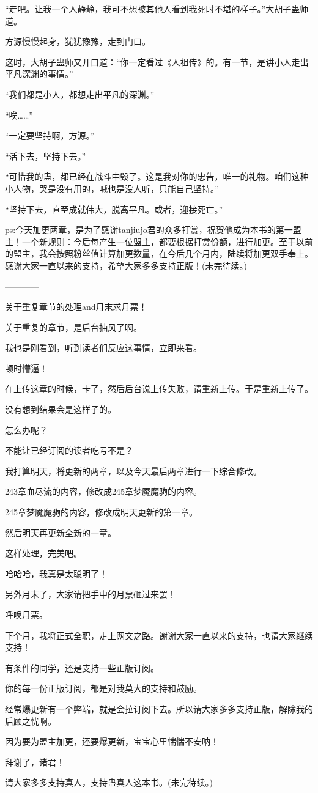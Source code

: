\begin{this_body}
“走吧。让我一个人静静，我可不想被其他人看到我死时不堪的样子。”大胡子蛊师道。

方源慢慢起身，犹犹豫豫，走到门口。

这时，大胡子蛊师又开口道：“你一定看过《人祖传》的。有一节，是讲小人走出平凡深渊的事情。”

“我们都是小人，都想走出平凡的深渊。”

“唉……”

“一定要坚持啊，方源。”

“活下去，坚持下去。”

“可惜我的蛊，都已经在战斗中毁了。这是我对你的忠告，唯一的礼物。咱们这种小人物，哭是没有用的，喊也是没人听，只能自己坚持。”

“坚持下去，直至成就伟大，脱离平凡。或者，迎接死亡。”

ps:今天加更两章，是为了感谢tanjiujo君的众多打赏，祝贺他成为本书的第一盟主！一个新规则：今后每产生一位盟主，都要根据打赏份额，进行加更。至于以前的盟主，我会按照粉丝值计算加更数量，在今后几个月内，陆续将加更双手奉上。感谢大家一直以来的支持，希望大家多多支持正版！(未完待续。)

------------

关于重复章节的处理and月末求月票！

关于重复的章节，是后台抽风了啊。

我也是刚看到，听到读者们反应这事情，立即来看。

顿时懵逼！

在上传这章的时候，卡了，然后后台说上传失败，请重新上传。于是重新上传了。

没有想到结果会是这样子的。

怎么办呢？

不能让已经订阅的读者吃亏不是？

我打算明天，将更新的两章，以及今天最后两章进行一下综合修改。

243章血尽流的内容，修改成245章梦魇魔驹的内容。

245章梦魇魔驹的内容，修改成明天更新的第一章。

然后明天再更新全新的一章。

这样处理，完美吧。

哈哈哈，我真是太聪明了！

另外月末了，大家请把手中的月票砸过来罢！

呼唤月票。

下个月，我将正式全职，走上网文之路。谢谢大家一直以来的支持，也请大家继续支持！

有条件的同学，还是支持一些正版订阅。

你的每一份正版订阅，都是对我莫大的支持和鼓励。

经常爆更新有一个弊端，就是会拉订阅下去。所以请大家多多支持正版，解除我的后顾之忧啊。

因为要为盟主加更，还要爆更新，宝宝心里惴惴不安呐！

拜谢了，诸君！

请大家多多支持真人，支持蛊真人这本书。(未完待续。)

\end{this_body}

